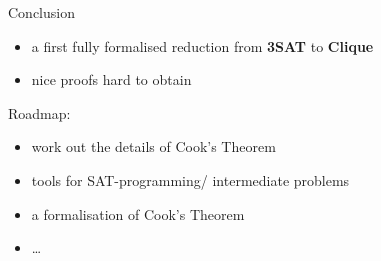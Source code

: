 \documentclass[11pt,usenames,dvipsnames,
  hyperref={pdfencoding=auto,psdextra}]{beamer}
\makeatletter
\def\beamer@writeslidentry@miniframesoff{%
  \expandafter\beamer@ifempty\expandafter{\beamer@framestartpage}{}%
  {%
    \clearpage\beamer@notesactions%
  }
}
\newcommand*{\miniframesoff}{\let\beamer@writeslidentry=\beamer@writeslidentry@miniframesoff}
\makeatother
\begin{document}
\begin{frame}
\begin{columns}
\begin{column}{0.3\textwidth}
\begin{center}
{
        }
      \end{center}
    \end{column}
  \end{columns}
\end{frame}



\begin{frame}{Conclusion}
  \begin{itemize}
    \item a first fully formalised reduction from \textbf{3SAT} to \textbf{Clique}
    \item nice proofs hard to obtain
  \end{itemize}

  \vspace{5ex}

  Roadmap:
  \begin{itemize}
    \item work out the details of Cook's Theorem
    \item tools for SAT-programming/ intermediate problems
    \item a formalisation of Cook's Theorem
    \item \ldots 
  \end{itemize}
\end{frame}

\miniframesoff
\section{}
\end{document}
